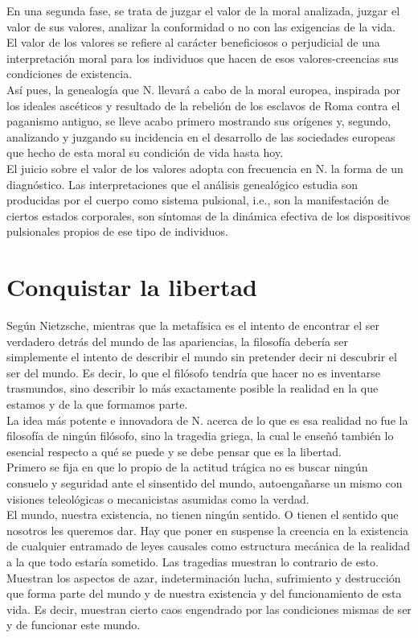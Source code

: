 \documentclass[a4paper, 10pt, twocolumn, spanish]{article}
\begin{document}
En una segunda fase, se trata de juzgar el valor de la moral
analizada, juzgar el valor de sus valores, analizar la conformidad o
no con las exigencias de la vida.\\[0pt]
El valor de los valores se refiere al carácter beneficiosos o
perjudicial de una interpretación moral para los individuos que hacen
de esos valores-creencias sus condiciones de existencia.\\[0pt]

Así pues, la genealogía que N. llevará a cabo de la moral europea,
inspirada por los ideales ascéticos y resultado de la rebelión de los
esclavos de Roma contra el paganismo antiguo, se lleve acabo primero
mostrando sus orígenes y, segundo, analizando y juzgando su incidencia
en el desarrollo de las sociedades europeas que hecho de esta moral su
condición de vida hasta hoy.\\[0pt]
El juicio sobre el valor de los valores adopta con frecuencia en N. la
forma de un diagnóstico. Las interpretaciones que el análisis
genealógico estudia son producidas por el cuerpo como sistema
pulsional, i.e., son la manifestación de ciertos estados corporales,
son síntomas de la dinámica efectiva de los dispositivos pulsionales
propios de ese tipo de individuos.

\section{Conquistar la libertad}
\label{sec:orgd1e4d6c}
Según Nietzsche, mientras que la metafísica es el intento de encontrar
el ser verdadero detrás del mundo de las apariencias, la filosofía
debería ser simplemente el intento de describir el mundo sin pretender
decir ni descubrir el ser del mundo. Es decir, lo que el filósofo
tendría que hacer no es inventarse trasmundos, sino describir lo más
exactamente posible la realidad en la que estamos y de la que formamos
parte.\\[0pt]
La idea más potente e innovadora de N. acerca de lo que es esa
realidad no fue la filosofía de ningún filósofo, sino la tragedia
griega, la cual le enseñó también lo esencial respecto a qué se puede
y se debe pensar que es la libertad.\\[0pt]

Primero se fija en que lo propio de la actitud trágica no es buscar
ningún consuelo y seguridad ante el sinsentido del mundo,
autoengañarse un mismo con visiones teleológicas o mecanicistas
asumidas como la verdad.\\[0pt]
El mundo, nuestra existencia, no tienen ningún sentido. O tienen el
sentido que nosotros les queremos dar. Hay que poner en suspense la
creencia en la existencia de cualquier entramado de leyes causales
como estructura mecánica de la realidad a la que todo estaría
sometido. Las tragedias muestran lo contrario de esto. Muestran los
aspectos de azar, indeterminación lucha, sufrimiento y destrucción que
forma parte del mundo y de nuestra existencia y del funcionamiento de
esta vida. Es decir, muestran cierto caos engendrado por las
condiciones mismas de ser y de funcionar este mundo.\\[0pt]
\end{document}
